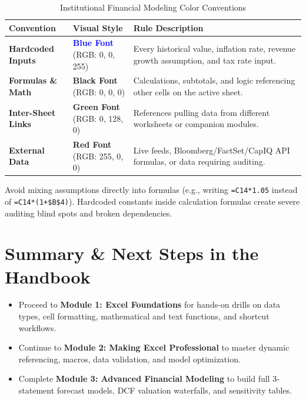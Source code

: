 \documentclass[11pt,a4paper]{article}
\begin{document}
\begin{table}[htbp]
\centering
\small
\begin{tabular}{L{3.2cm} L{3.5cm} L{7.5cm}}
\toprule
\textbf{Convention} & \textbf{Visual Style} & \textbf{Rule Description} \\
\midrule
\textbf{Hardcoded Inputs} & \textcolor{blue}{\textbf{Blue Font}} (RGB: 0, 0, 255) & Every historical value, inflation rate, revenue growth assumption, and tax rate input. \\
\addlinespace
\textbf{Formulas \& Math} & \textbf{Black Font} (RGB: 0, 0, 0) & Calculations, subtotals, and logic referencing other cells on the active sheet. \\
\addlinespace
\textbf{Inter-Sheet Links} & \textcolor{tipgreen}{\textbf{Green Font}} (RGB: 0, 128, 0) & References pulling data from different worksheets or companion modules. \\
\addlinespace
\textbf{External Data} & \textcolor{warnred}{\textbf{Red Font}} (RGB: 255, 0, 0) & Live feeds, Bloomberg/FactSet/CapIQ API formulas, or data requiring auditing. \\
\bottomrule
\end{tabular}
\caption{Institutional Financial Modeling Color Conventions}
\label{tab:color-conventions}
\end{table}

\begin{pitfall}
Avoid mixing assumptions directly into formulas (e.g., writing \texttt{=C14*1.05} instead of \texttt{=C14*(1+\$B\$4)}). Hardcoded constants inside calculation formulas create severe auditing blind spots and broken dependencies.
\end{pitfall}

\section{Summary \& Next Steps in the Handbook}

\begin{itemize}
  \item Proceed to \textbf{Module 1: Excel Foundations} for hands-on drills on data types, cell formatting, mathematical and text functions, and shortcut workflows.
  \item Continue to \textbf{Module 2: Making Excel Professional} to master dynamic referencing, macros, data validation, and model optimization.
  \item Complete \textbf{Module 3: Advanced Financial Modeling} to build full 3-statement forecast models, DCF valuation waterfalls, and sensitivity tables.
\end{itemize}
\end{document}
